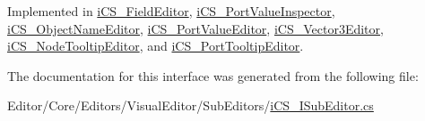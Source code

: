 Implemented in \hyperlink{classi_c_s___field_editor_a1d55490c95942bd38ed2b2ba1abcea78}{i\+C\+S\+\_\+\+Field\+Editor}, \hyperlink{classi_c_s___port_value_inspector_a7f44fe661315dfe215a16afa1d7f1700}{i\+C\+S\+\_\+\+Port\+Value\+Inspector}, \hyperlink{classi_c_s___object_name_editor_a21d8f03208645383da5219451327c737}{i\+C\+S\+\_\+\+Object\+Name\+Editor}, \hyperlink{classi_c_s___port_value_editor_ad20b913c17ecf2d23f7291d94090cd7a}{i\+C\+S\+\_\+\+Port\+Value\+Editor}, \hyperlink{classi_c_s___vector3_editor_a7836bdfcff3316fc2997bd14f6b91914}{i\+C\+S\+\_\+\+Vector3\+Editor}, \hyperlink{classi_c_s___node_tooltip_editor_aac4bd4609198e101859135aecf02a7fa}{i\+C\+S\+\_\+\+Node\+Tooltip\+Editor}, and \hyperlink{classi_c_s___port_tooltip_editor_af73a387e8c128b778bba4c5e20f0266a}{i\+C\+S\+\_\+\+Port\+Tooltip\+Editor}.



The documentation for this interface was generated from the following file\+:\begin{DoxyCompactItemize}
\item 
Editor/\+Core/\+Editors/\+Visual\+Editor/\+Sub\+Editors/\hyperlink{i_c_s___i_sub_editor_8cs}{i\+C\+S\+\_\+\+I\+Sub\+Editor.\+cs}\end{DoxyCompactItemize}
